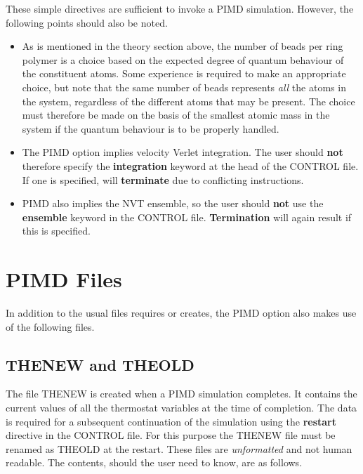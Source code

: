 \noindent These simple directives are sufficient to invoke a PIMD simulation.
However, the following points should also be noted.
\begin{itemize}
\item As is mentioned in the theory section above, the number of beads
  per ring polymer is a choice based on the expected degree of quantum
  behaviour of the constituent atoms. Some experience is required to
  make an appropriate choice, but note that the same number of beads
  represents {\em all} the atoms in the system, regardless of the
  different atoms that may be present.  The choice must therefore be
  made on the basis of the smallest atomic mass in the system if the
  quantum behaviour is to be properly handled.

\item The PIMD option implies velocity Verlet integration. The user
  should {\bf not} therefore specify the {\bf integration} keyword at
  the head of the CONTROL file. If one is specified, \DD{} will
  {\bf terminate} due to conflicting instructions.

\item PIMD also implies the NVT ensemble, so the user should {\bf not} use
  the {\bf ensemble} keyword in the CONTROL file. {\bf Termination} will
  again result if this is specified.
\end{itemize}

\section{PIMD Files}

In addition to the usual files \DD{} requires or creates, the PIMD
option also makes use of the following files.

\subsection{THENEW and THEOLD}

The file THENEW is created when a PIMD simulation completes. It
contains the current values of all the thermostat variables at the
time of completion. The data is required for a subsequent continuation
of the simulation using the {\bf restart} directive in the CONTROL
file. For this purpose the THENEW file must be renamed as THEOLD at
the restart. These files are {\em unformatted} and not human
readable. The contents, should the user need to know, are as follows.\\

